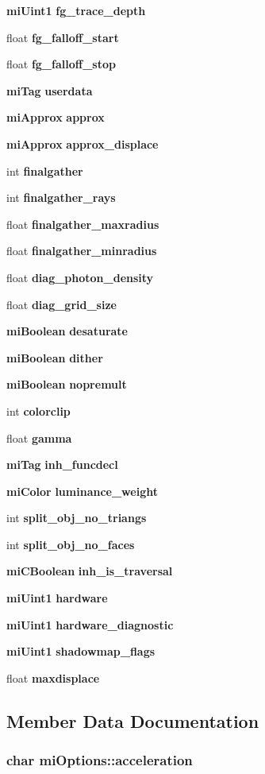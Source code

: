 \begin{CompactItemize}
\item 
{\bf mi\-Uint1} {\bf fg\_\-trace\_\-depth}
\item 
float {\bf fg\_\-falloff\_\-start}
\item 
float {\bf fg\_\-falloff\_\-stop}
\item 
{\bf mi\-Tag} {\bf userdata}
\item 
{\bf mi\-Approx} {\bf approx}
\item 
{\bf mi\-Approx} {\bf approx\_\-displace}
\item 
int {\bf finalgather}
\item 
int {\bf finalgather\_\-rays}
\item 
float {\bf finalgather\_\-maxradius}
\item 
float {\bf finalgather\_\-minradius}
\item 
float {\bf diag\_\-photon\_\-density}
\item 
float {\bf diag\_\-grid\_\-size}
\item 
{\bf mi\-Boolean} {\bf desaturate}
\item 
{\bf mi\-Boolean} {\bf dither}
\item 
{\bf mi\-Boolean} {\bf nopremult}
\item 
int {\bf colorclip}
\item 
float {\bf gamma}
\item 
{\bf mi\-Tag} {\bf inh\_\-funcdecl}
\item 
{\bf mi\-Color} {\bf luminance\_\-weight}
\item 
int {\bf split\_\-obj\_\-no\_\-triangs}
\item 
int {\bf split\_\-obj\_\-no\_\-faces}
\item 
{\bf mi\-CBoolean} {\bf inh\_\-is\_\-traversal}
\item 
{\bf mi\-Uint1} {\bf hardware}
\item 
{\bf mi\-Uint1} {\bf hardware\_\-diagnostic}
\item 
{\bf mi\-Uint1} {\bf shadowmap\_\-flags}
\item 
float {\bf maxdisplace}
\end{CompactItemize}


\subsection{Member Data Documentation}
\subsubsection{\setlength{\rightskip}{0pt plus 5cm}char {\bf mi\-Options::acceleration}}\label{structmiOptions_o49}



